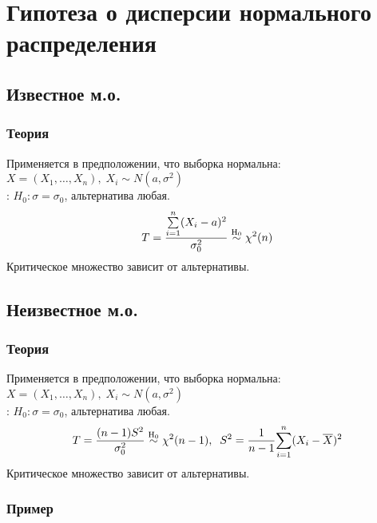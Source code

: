 \section{Гипотеза о дисперсии нормального распределения}\label{cha:1sample/sec:var}

\subsection{Известное м.о.}\label{cha:1sample/sec:var/subsec:mo}

\subsubsection*{Теория}\label{cha:1sample/sec:var/subsec:mo/subsubsec:theory}

Применяется в предположении, что выборка нормальна: \\$X = (X_1, \dots, X_n), \; X_i \sim N(a, \sigma^2)$\\
: $H_0: \sigma = \sigma_0$, альтернатива любая.
$$T = \frac{\underset{i=1}{\overset{n}{\sum}}(X_i - a)^2}{\sigma_0^2} \mathrel{\stackrel{\rm H_0}\sim} \chi^2 (n)$$
Критическое множество зависит от альтернативы.

\subsection{Неизвестное м.о.}\label{cha:1sample/sec:var/subsec:nemo}

\subsubsection*{Теория}\label{cha:1sample/sec:var/subsec:nemo/subsubsec:theory}

Применяется в предположении, что выборка нормальна: \\$X = (X_1, \dots, X_n), \; X_i \sim N(a, \sigma^2)$\\
: $H_0: \sigma = \sigma_0$, альтернатива любая.
$$T = \frac{(n-1)S^2}{\sigma_0^2} \mathrel{\stackrel{\rm H_0}\sim} \chi^2 (n-1), \;\; S^2 = \frac{1}{n-1} \underset{i=1}{\overset{n}{\sum}}(X_i - \overline{X})^2$$
Критическое множество зависит от альтернативы.

\subsubsection*{Пример}\label{cha:1sample/sec:var/subsec:nemo/subsubsec:python}

